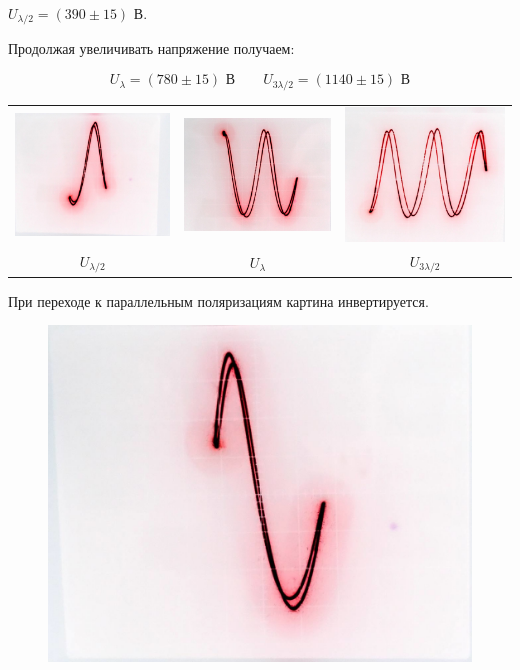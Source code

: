 \documentclass[a4paper,12pt]{article} %
\begin{document}
{$U_{\lambda/2} = (390 \pm 15) \text{ В}$}. 

\noindent Продолжая увеличивать напряжение получаем:

\[U_\lambda = (780 \pm 15) \text{ В} \qquad U_{3\lambda/2} = (1140 \pm 15) \text{ В}\]


\begin{table}[h!]
\begin{tabular}{lll}
\includegraphics[width=0.3\linewidth]{1-2.jpg} & \includegraphics[width=0.3\linewidth]{1-0.jpg} & \includegraphics[width=0.3\linewidth]{3-2.jpg} \\
\multicolumn{1}{c}{$U_{\lambda/2}$}  & \multicolumn{1}{c}{$U_{\lambda}$} & \multicolumn{1}{c}{$U_{3\lambda/2}$}
\end{tabular}
\end{table}

\medskip

\noindent При переходе к параллельным поляризациям картина инвертируется.

\medskip

\begin{figure}[!h]
 	\centering
 	\includegraphics[width=0.3\linewidth]{inv.jpg}
 
 \end{figure}
\end{document}
